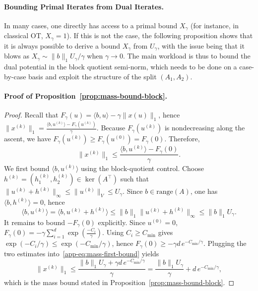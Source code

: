 \documentclass{article}
\theoremstyle{plain}
\newcommand{\Umax}{U_\gamma}
\newcommand{\Xmax}{X_\gamma}
\begin{document}
\paragraph{Bounding Primal Iterates from Dual Iterates.}
\label{app-sec:bounding-primal-dual}

In many cases, one directly has access to a primal bound $\Xmax$ (for instance, in classical OT, $\Xmax=1$). If this is not the case, the following proposition shows that it is always possible to derive a bound $\Xmax$ from $\Umax$, with the issue being that it blows as $\Xmax \sim \|b\|_1 \Umax/\gamma$ when  $\gamma\to 0$.
%
The main workload is thus to bound the dual potential in the block quotient semi-norm, which needs to be done on a case-by-case basis and exploit the structure of the split $(A_1,A_2)$. 


\paragraph{Proof of Proposition~\ref{prop:mass-bound-block}.}
\begin{proof}
Recall that $F_{\gamma}(u)=\langle b,u\rangle-\gamma\|x(u)\|_{1}$, hence
$
\|x^{(k)}\|_{1}=\frac{\langle b,u^{(k)}\rangle-F_{\gamma}(u^{(k)})}{\gamma}.
$
Because $F_{\gamma}(u^{(k)})$ is nondecreasing along the ascent, we have
$F_{\gamma}(u^{(k)})\ge F_{\gamma}(u^{(0)})=F_\gamma(0)$. Therefore,
\begin{equation}\label{app-eq:mass-first-bound}
\|x^{(k)}\|_{1}\le \frac{\langle b,u^{(k)}\rangle-F_{\gamma}(0)}{\gamma}.
\end{equation}
We first bound $\langle b,u^{(k)}\rangle$ using the block-quotient control.
Choose $h^{(k)}=(h_1^{(k)},h_2^{(k)})\in\ker(A^\top)$ such that
$\|u^{(k)}+h^{(k)}\|_{\infty}\le \|u^{(k)}\|_{V}\le \Umax$.
Since $b\in\mathrm{range}(A)$, one has $\langle b,h^{(k)}\rangle=0$, hence
\[
\langle b,u^{(k)}\rangle=\langle b,u^{(k)}+h^{(k)}\rangle
\le \|b\|_{1}\|u^{(k)}+h^{(k)}\|_{\infty}
\le \|b\|_{1}\Umax.
\]
It remains to bound $-F_\gamma(0)$ explicitly. Since $u^{(0)}=0$,
$F_\gamma(0)=-\gamma\sum_{i=1}^d \exp(\tfrac{-C_i}{\gamma} )$.
Using $C_i\ge C_{\min}$ gives $\exp(-C_i/\gamma)\le \exp(-C_{\min}/\gamma)$, hence
$F_\gamma(0)\ge -\gamma d\,e^{-C_{\min}/\gamma}$.
Plugging the two estimates into~\eqref{app-eq:mass-first-bound} yields
\[
\|x^{(k)}\|_{1}\le \frac{\|b\|_{1}\Umax+\gamma d\,e^{-C_{\min}/\gamma}}{\gamma}
=\frac{\|b\|_{1}\Umax}{\gamma}+d\,e^{-C_{\min}/\gamma},
\]
which is the mass bound stated in Proposition~\ref{prop:mass-bound-block}.
\end{proof}
\end{document}
